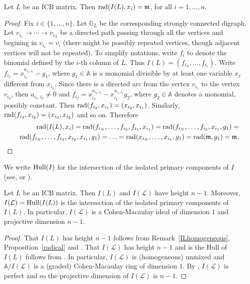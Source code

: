 \documentclass[ALCO]{cedram}
\newcommand{\mba}{\mbox{$\mathbb{A}$}}
\newcommand{\mbg}{\mbox{$\mathbb{G}$}}
\newcommand{\mcl}{\mbox{$\mathcal{L}$}}
\newcommand{\icb}{\mbox{$\mathrm{ICB}$}}
\newcommand{\mfm}{\mbox{$\mathfrak{m}$}}
\newcommand{\rad}{\mbox{${\rm rad}$}}
\newcommand{\hull}{\mbox{${\rm Hull}$}}
\begin{document}
\begin{proposition}\label{radical}
Let $L$ be an $\icb$ matrix. Then $\rad(I(L),x_{i})=\mfm$, for all
$i=1,\ldots ,n$.
\end{proposition}
\begin{proof}
Fix $i\in\{1,\ldots ,n\}$. Let $\mbg_L$ be the corresponding strongly
connected digraph. Let $v_{i_1}\to\cdots\to v_{i_N}$ be a directed
path passing through all the vertices and begining in $v_{i_1}=v_i$
(there might be possibly repeated vertices, though adjacent vertices
will not be repeated). To simplify notations, write $f_i$ to denote
the binomial defined by the $i$-th column of $L$. Thus
$I(L)=(f_{i_N},\ldots ,f_{i_1})$. Write
$f_{i_1}=x_{i_1}^{a_{i_1,i_1}}-g_1$, where $g_1\in \mba$ is a monomial
divisible by at least one variable $x_j$ different from $x_{i_1}$.
Since there is a directed arc from the vertex $v_{i_1}$ to the vertex
$v_{i_2}$, then $a_{i_1,i_2}\neq 0$ and
$f_{i_2}=x_{i_2}^{a_{i_2,i_2}}-x_{i_1}^{a_{i_1,i_2}}g_2$, where
$g_2\in \mba$ denotes a monomial, possibly constant. Then
$\rad(f_{i_2},x_{i_1})=(x_{i_2},x_{i_1})$.  Similarly,
$\rad(f_{i_3},x_{i_2})=(x_{i_3},x_{i_2})$ and so on. Therefore
\begin{eqnarray*}
&&\rad(I(L),x_{i})=\rad(f_{i_N},\ldots
  ,f_{i_2},f_{i_1},x_{i_1})=\rad(f_{i_N},\ldots
  ,f_{i_2},x_{i_1},g_1)=\\ &&\rad(f_{i_N},\ldots
  ,f_{i_3},x_{i_2},x_{i_1},g_1)=\ldots =\rad(x_{i_N},\ldots
  ,x_{i_1},g_1)=\rad(\mfm,g_1)=\mfm.
\end{eqnarray*}
\end{proof}

We write $\hull(I)$ for the intersection of the isolated primary
components of $I$ (see, \eg \cite{op} or \cite{opv}).

\begin{corollary}\label{projdim}
Let $L$ be an $\icb$ matrix. Then $I(L)$ and $I(\mcl)$ have height
$n-1$. Moreover, $I(\mcl)=\hull(I(L))$ is the intersection of the
isolated primary components of $I(L)$. In particular, $I(\mcl)$ is a
Cohen-Macaulay ideal of dimension $1$ and projective dimension $n-1$.
\end{corollary}
\begin{proof}
That $I(L)$ has height $n-1$ follows from Remark~\ref{ILhomogeneous},
Proposition~\ref{radical} and \cite[Lemma~5.1]{opv}. That $I(\mcl)$
has height $n-1$ and is the Hull of $I(L)$ follows from
\cite[Proposition~5.7]{opv}. In particular, $I(\mcl)$ is (homogeneous)
unmixed and $\mba/I(\mcl)$ is a (graded) Cohen-Macaulay ring of dimension
$1$. By \cite[Corollary~2.2.15]{bh}, $I(\mcl)$ is perfect and so the
projective dimension of $I(\mcl)$ is $n-1$.
\end{proof}
\end{document}
